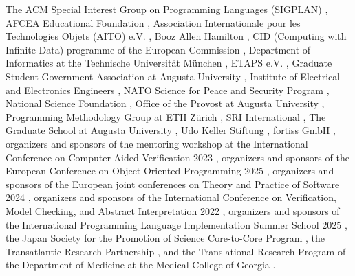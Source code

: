 The ACM Special Interest Group on Programming Languages (SIGPLAN)%
, AFCEA Educational Foundation%
, Association Internationale pour les Technologies Objets (AITO) e.V.%
, Booz Allen Hamilton%
, CID (Computing with Infinite Data) programme of the European Commission%
, Department of Informatics at the Technische Universität München%
, ETAPS e.V.%
, Graduate Student Government Association at Augusta University%
, Institute of Electrical and Electronics Engineers%
, NATO Science for Peace and Security Program%
, National Science Foundation%
, Office of the Provost at Augusta University%
, Programming Methodology Group at ETH Zürich%
, SRI International%
, The Graduate School at Augusta University%
, Udo Keller Stiftung%
, fortiss GmbH%
, organizers and sponsors of the mentoring workshop at the International Conference on Computer Aided Verification 2023%
, organizers and sponsors of the European Conference on Object-Oriented Programming 2025%
, organizers and sponsors of the European joint conferences on Theory and Practice of Software 2024%
, organizers and sponsors of the International Conference on Verification, Model Checking, and Abstract Interpretation 2022%
, organizers and sponsors of the International Programming Language Implementation Summer School 2025%
, the Japan Society for the Promotion of Science Core-to-Core Program%
, the Transatlantic Research Partnership%
, and the Translational Research Program of the Department of Medicine at the Medical College of Georgia%
.

